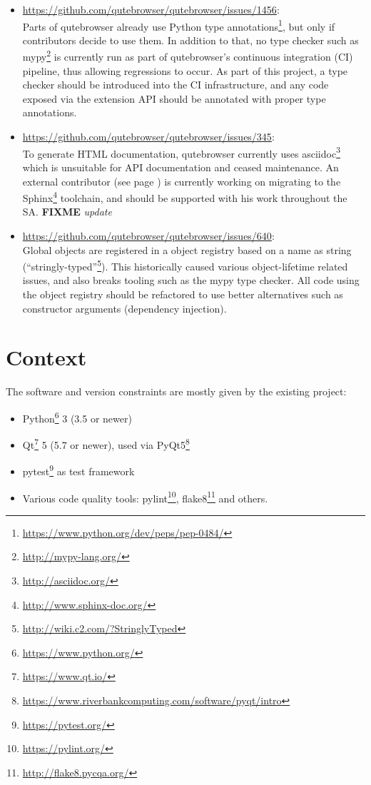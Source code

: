 \documentclass[a4paper,parskip=full,DIV=14,BCOR=15mm]{scrreprt}
\newcommand{\fixme}[1]{\textbf{FIXME} \emph{#1}}
\begin{document}
\begin{itemize}
  \item \url{https://github.com/qutebrowser/qutebrowser/issues/1456}: \\ Parts of qutebrowser already use Python type
    annotations\footnote{\url{https://www.python.org/dev/peps/pep-0484/}}, but
    only if contributors decide to use them. In addition to that, no type
    checker such as mypy\footnote{\url{http://mypy-lang.org/}} is currently run
    as part of qutebrowser's continuous integration (CI) pipeline, thus allowing
    regressions to occur. As part of this project, a type checker should be
    introduced into the CI infrastructure, and any code exposed via the extension
    API should be annotated with proper type annotations.
  \item \url{https://github.com/qutebrowser/qutebrowser/issues/345}: \\
    To generate HTML documentation, qutebrowser currently uses
    asciidoc\footnote{\url{http://asciidoc.org/}} which is unsuitable for API
    documentation and ceased maintenance. An external contributor (see page
    \pageref{fiete}) is currently working on migrating to the
    Sphinx\footnote{\url{http://www.sphinx-doc.org/}} toolchain, and should be
    supported with his work throughout the SA. \fixme{update}
  \item \url{https://github.com/qutebrowser/qutebrowser/issues/640}: \\
    Global objects are registered in a object registry based on a name as
    string (``stringly-typed''\footnote{\url{http://wiki.c2.com/?StringlyTyped}}).
    This historically caused various object-lifetime related issues, and also
breaks tooling such as the mypy type checker. All code using the object registry
should be refactored to use better alternatives such as constructor arguments
(dependency injection).
\end{itemize}

\section{Context}
\label{context}

The software and version constraints are mostly given by the existing project:

\begin{itemize}
  \item Python\footnote{\url{https://www.python.org/}} 3 (3.5 or newer)
  \item Qt\footnote{\url{https://www.qt.io/}} 5 (5.7 or newer), used via PyQt5\footnote{\url{https://www.riverbankcomputing.com/software/pyqt/intro}}
  \item pytest\footnote{\url{https://pytest.org/}} as test framework
  \item Various code quality tools: pylint\footnote{\url{https://pylint.org/}},
    flake8\footnote{\url{http://flake8.pycqa.org/}} and others.
\end{itemize}
\end{document}
